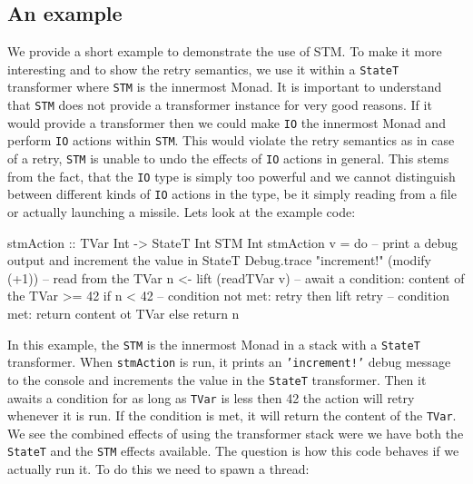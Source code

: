 \subsection{An example}
We provide a short example to demonstrate the use of STM. To make it more interesting and to show the retry semantics, we use it within a \texttt{StateT} transformer where \texttt{STM} is the innermost Monad. It is important to understand that \texttt{STM} does not provide a transformer instance for very good reasons. If it would provide a transformer then we could make \texttt{IO} the innermost Monad and perform \texttt{IO} actions within \texttt{STM}. This would violate the retry semantics as in case of a retry, \texttt{STM} is unable to undo the effects of \texttt{IO} actions in general. This stems from the fact, that the \texttt{IO} type is simply too powerful and we cannot distinguish between different kinds of \texttt{IO} actions in the type, be it simply reading from a file or actually launching a missile. %
Lets look at the example code:

\begin{HaskellCode}
stmAction :: TVar Int -> StateT Int STM Int 
stmAction v = do
  -- print a debug output and increment the value in StateT 
  Debug.trace "increment!" (modify (+1))
  -- read from the TVar
  n <- lift (readTVar v)
  -- await a condition: content of the TVar >= 42
  if n < 42
    -- condition not met: retry
    then lift retry
    -- condition met: return content ot TVar
    else return n
\end{HaskellCode}

In this example, the \texttt{STM} is the innermost Monad in a stack with a \texttt{StateT} transformer. When \texttt{stmAction} is run, it prints an \texttt{'increment!'} debug message to the console and increments the value in the \texttt{StateT} transformer. Then it awaits a condition for as long as \texttt{TVar} is less then 42 the action will retry whenever it is run. If the condition is met, it will return the content of the \texttt{TVar}. We see the combined effects of using the transformer stack were we have both the \texttt{StateT} and the \texttt{STM} effects available. The question is how this code behaves if we actually run it. To do this we need to spawn a thread:

